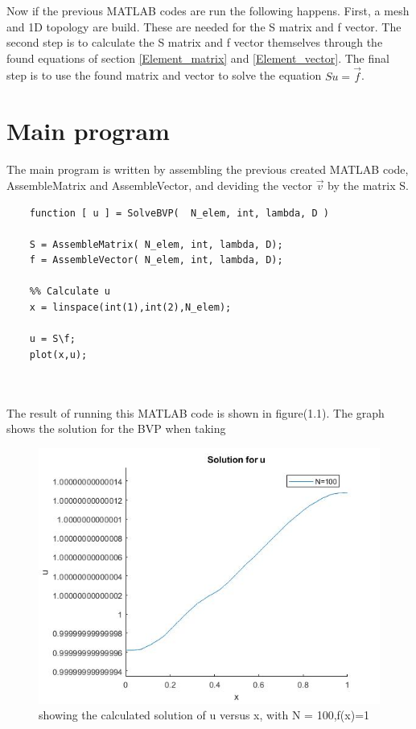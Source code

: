 \documentclass[a4paper]{report}
\begin{document}
Now if the previous MATLAB codes are run the following happens. First, a mesh and 1D topology are build. These are needed for the S matrix and f vector. The second step is to calculate the S matrix and f vector themselves through the found equations of section \ref{Element_matrix} and \ref{Element_vector}. The final step is to use the found matrix and vector to solve the equation $Su=\vec{f}$.





\section{Main program}

The main program is written by assembling the previous created MATLAB code, AssembleMatrix and AssembleVector, and deviding the vector $\vec{v}$ by the matrix S.
\begin{lstlisting}
	function [ u ] = SolveBVP(  N_elem, int, lambda, D )
	
	S = AssembleMatrix( N_elem, int, lambda, D);
	f = AssembleVector( N_elem, int, lambda, D);
	
	%% Calculate u
	x = linspace(int(1),int(2),N_elem);
	
	u = S\f;
	plot(x,u); 
	
	
\end{lstlisting}
The result of running this MATLAB code is shown in figure(1.1). The graph shows the solution for the BVP when taking 

\begin{figure}[ht!]
	\centering
	\includegraphics[width=150mm]{1Df1.jpg}
	\caption{showing the calculated solution of u versus x, with N = 100,f(x)=1 \label{overflow}}
\end{figure}
\end{document}
